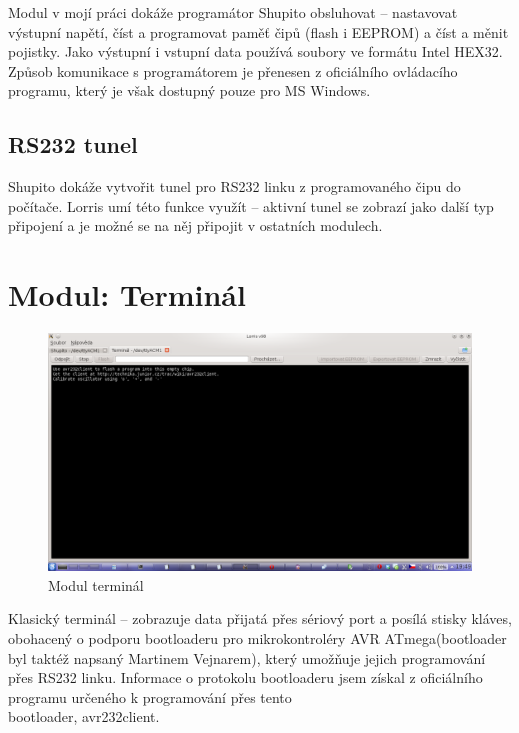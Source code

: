 \documentclass[12pt, a4paper, oneside]{article}
\begin{document}
Modul v mojí práci dokáže programátor Shupito obsluhovat -- nastavovat výstupní napětí, číst a programovat paměť čipů (flash i EEPROM) a číst a měnit pojistky. Jako výstupní i vstupní data používá soubory ve formátu Intel HEX32\cite{hex}. 
Způsob komunikace s programátorem je přenesen z oficiálního ovládacího programu\cite{avr232client}, který je však dostupný pouze pro MS Windows.

\subsection*{RS232 tunel}
\label{tunel}
Shupito dokáže vytvořit tunel pro RS232 linku z programovaného čipu do počítače. Lorris umí této funkce využít -- aktivní tunel se zobrazí jako další typ připojení a je možné se na něj připojit v ostatních modulech.

\newpage
\setlength{\voffset}{0mm} %
\pagestyle{plain}

\section*{Modul: Terminál}

\begin{figure}[h]
\begin{center}
\includegraphics[width=\textwidth]{img/terminal.png}
\caption{Modul terminál}
\label{Terminal}
\end{center}
\end{figure}

Klasický terminál -- zobrazuje data přijatá přes sériový port a posílá stisky kláves, obohacený o podporu bootloaderu pro mikrokontroléry AVR ATmega(bootloader byl taktéž napsaný Martinem Vejnarem), který umožňuje jejich programování přes RS232 linku. Informace o protokolu bootloaderu jsem získal z oficiálního programu určeného k programování přes tento\\bootloader, avr232client\cite{avr232client}.
\end{document}
